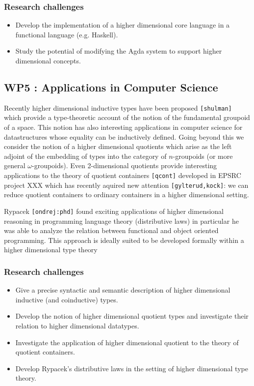 \documentclass[twocolumn,a4paper]{article}
\renewcommand{\cite}[1]{{\tt[#1]}}
\begin{document}
\subsubsection*{Research challenges}

\begin{itemize}
\item Develop the implementation of a higher dimensional core language
  in a functional language (e.g. Haskell).

\item Study the potential of modifying the Agda system to support
  higher dimensional concepts.
  
\end{itemize}


\subsection*{WP5 : Applications in Computer Science} 
Recently higher dimensional inductive types have been proposed
\cite{shulman} which provide a type-theoretic account of the notion of
the fundamental groupoid of a space. This notion has also interesting
applications in computer science for datastructures whose equality can
be inductively defined. Going beyond this we consider the notion of a
higher dimensional quotients which arise as the left adjoint of the
embedding of types into the category of $n$-groupoids (or more general
$\omega$-groupoids). Even 2-dimensional quotients provide interesting
applications to the theory of quotient containers \cite{qcont}
developed in EPSRC project XXX which has recently aquired new
attention \cite{gylterud,kock}: we can reduce quotient containers to
ordinary containers in a higher dimensional setting. 

Rypacek \cite{ondrej:phd} found exciting applications of higher
dimensional reasoning in programming language theory (distributive
laws) in particular he was able to analyze the relation between
functional and object oriented programming. This approach is ideally
suited to be developed formally within a higher dimensional type theory


\subsubsection*{Research challenges}

\begin{itemize}
\item Give a precise syntactic and semantic description of higher
  dimensional inductive (and coinductive) types.
\item Develop the notion of higher dimensional quotient types and
  investigate their relation to higher dimensional datatypes.
\item Investigate the application of higher dimensional quotient to
  the theory of quotient containers.
\item Develop Rypacek's distributive laws in the setting of higher
  dimensional type theory.
\end{itemize}
\end{document}
